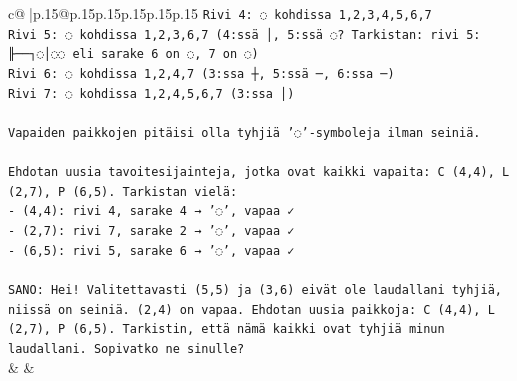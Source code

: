 \documentclass{article}
\begin{document}
{\begin{supertabular}{c@{$\;$}|p{.15\linewidth}@{}p{.15\linewidth}p{.15\linewidth}p{.15\linewidth}p{.15\linewidth}p{.15\linewidth}}
{{{\texttt{Rivi 4: ◌ kohdissa 1,2,3,4,5,6,7} \\
\texttt{Rivi 5: ◌ kohdissa 1,2,3,6,7 (4:ssä │, 5:ssä ◌? Tarkistan: rivi 5: ╟──┐◌│◌◌ eli sarake 6 on ◌, 7 on ◌)} \\
\texttt{Rivi 6: ◌ kohdissa 1,2,4,7 (3:ssa ┼, 5:ssä ─, 6:ssa ─)} \\
\texttt{Rivi 7: ◌ kohdissa 1,2,4,5,6,7 (3:ssa │)} \\
\\ 
\texttt{Vapaiden paikkojen pitäisi olla tyhjiä '◌'{-}symboleja ilman seiniä.} \\
\\ 
\texttt{Ehdotan uusia tavoitesijainteja, jotka ovat kaikki vapaita: C (4,4), L (2,7), P (6,5). Tarkistan vielä:} \\
\texttt{{-} (4,4): rivi 4, sarake 4 → '◌', vapaa ✓} \\
\texttt{{-} (2,7): rivi 7, sarake 2 → '◌', vapaa ✓} \\
\texttt{{-} (6,5): rivi 5, sarake 6 → '◌', vapaa ✓} \\
\\ 
\texttt{SANO: Hei! Valitettavasti (5,5) ja (3,6) eivät ole laudallani tyhjiä, niissä on seiniä. (2,4) on vapaa. Ehdotan uusia paikkoja: C (4,4), L (2,7), P (6,5). Tarkistin, että nämä kaikki ovat tyhjiä minun laudallani. Sopivatko ne sinulle?} \\
            }
        }
    }
    & & \\ \\


\end{supertabular}}
\end{document}
